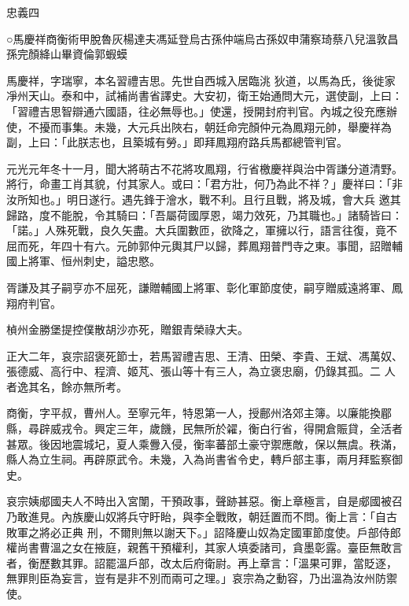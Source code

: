 
\begin{pinyinscope}

 忠義四



 ○馬慶祥商衡術甲脫魯灰楊達夫馮延登烏古孫仲端烏古孫奴申蒲察琦蔡八兒溫敦昌孫完顏絳山畢資倫郭蝦蟆



 馬慶祥，字瑞寧，本名習禮吉思。先世自西城入居臨洮
 狄道，以馬為氏，後徙家凈州天山。泰和中，試補尚書省譯史。大安初，衛王始通問大元，選使副，上曰：「習禮吉思智辯通六國語，往必無辱也。」使還，授開封府判官。內城之役充應辦使，不擾而事集。未幾，大元兵出陜右，朝廷命完顏仲元為鳳翔元帥，舉慶祥為副，上曰：「此朕志也，且築城有勞。」即拜鳳翔府路兵馬都總管判官。



 元光元年冬十一月，聞大將萌古不花將攻鳳翔，行省檄慶祥與治中胥謙分道清野。將行，命畫工肖其貌，付其家人。或曰：「君方壯，何乃為此不祥？」慶祥曰：「非汝所知也。」明日遂行。遇先鋒于澮水，戰不利。且行且戰，將及城，會大兵
 邀其歸路，度不能脫，令其騎曰：「吾屬荷國厚恩，竭力效死，乃其職也。」諸騎皆曰：「諾。」人殊死戰，良久矢盡。大兵圍數匝，欲降之，軍擁以行，語言往復，竟不屈而死，年四十有六。元帥郭仲元輿其尸以歸，葬鳳翔普門寺之東。事聞，詔贈輔國上將軍、恒州刺史，謚忠愍。



 胥謙及其子嗣亨亦不屈死，謙贈輔國上將軍、彰化軍節度使，嗣亨贈威遠將軍、鳳翔府判官。



 楨州金勝堡提控僕散胡沙亦死，贈銀青榮祿大夫。



 正大二年，哀宗詔褒死節士，若馬習禮吉思、王清、田榮、李貴、王斌、馮萬奴、張德威、高行中、程濟、姬芃、張山等十有三人，為立褒忠廟，仍錄其孤。二
 人者逸其名，餘亦無所考。



 商衡，字平叔，曹州人。至寧元年，特恩第一人，授鄜州洛郊主簿。以廉能換郿縣，尋辟威戎令。興定三年，歲饑，民無所於糴，衡白行省，得開倉賑貸，全活者甚眾。後因地震城圮，夏人乘釁入侵，衡率蕃部土豪守禦應敵，保以無虞。秩滿，縣人為立生祠。再辟原武令。未幾，入為尚書省令史，轉戶部主事，兩月拜監察御史。



 哀宗姨郕國夫人不時出入宮闈，干預政事，聲跡甚惡。衡上章極言，自是郕國被召乃敢進見。內族慶山奴將兵守盱眙，與李全戰敗，朝廷置而不問。衡上言：「自古敗軍之將必正典
 刑，不爾則無以謝天下。」詔降慶山奴為定國軍節度使。戶部侍郎權尚書曹溫之女在掖庭，親舊干預權利，其家人填委諸司，貪墨彰露。臺臣無敢言者，衡歷數其罪。詔罷溫戶部，改太后府衛尉。再上章言：「溫果可罪，當貶逐，無罪則臣為妄言，豈有是非不別而兩可之理。」哀宗為之動容，乃出溫為汝州防禦使。




\end{pinyinscope}
